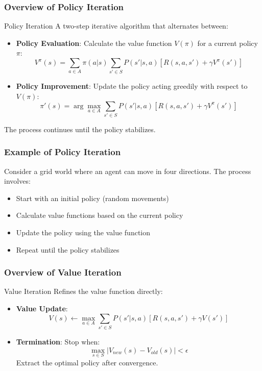 \documentclass[aspectratio=169]{beamer}
\begin{document}
\begin{frame}[fragile]
    \frametitle{Overview of Policy Iteration}
    \begin{block}{Policy Iteration}
        A two-step iterative algorithm that alternates between:
        \begin{itemize}
            \item \textbf{Policy Evaluation}: Calculate the value function \( V(\pi) \) for a current policy \( \pi \):
            \[
            V^{\pi}(s) = \sum_{a \in A} \pi(a|s) \sum_{s' \in S} P(s'|s, a) [R(s, a, s') + \gamma V^{\pi}(s')]
            \]
            \item \textbf{Policy Improvement}: Update the policy acting greedily with respect to \( V(\pi) \):
            \[
            \pi'(s) = \arg\max_{a \in A} \sum_{s' \in S} P(s'|s, a) [R(s, a, s') + \gamma V^{\pi}(s')]
            \]
        \end{itemize}
        The process continues until the policy stabilizes.
    \end{block}
\end{frame}

\begin{frame}[fragile]
    \frametitle{Example of Policy Iteration}
    Consider a grid world where an agent can move in four directions. The process involves:
    \begin{itemize}
        \item Start with an initial policy (random movements)
        \item Calculate value functions based on the current policy
        \item Update the policy using the value function
        \item Repeat until the policy stabilizes
    \end{itemize}
\end{frame}

\begin{frame}[fragile]
    \frametitle{Overview of Value Iteration}
    \begin{block}{Value Iteration}
        Refines the value function directly:
        \begin{itemize}
            \item \textbf{Value Update}:
            \[
            V(s) \gets \max_{a \in A} \sum_{s' \in S} P(s'|s, a) [R(s, a, s') + \gamma V(s')]
            \]
            \item \textbf{Termination}: Stop when:
            \[
            \max_{s \in S} |V_{new}(s) - V_{old}(s)| < \epsilon
            \]
            Extract the optimal policy after convergence.
        \end{itemize}
    \end{block}
\end{frame}
\end{document}
